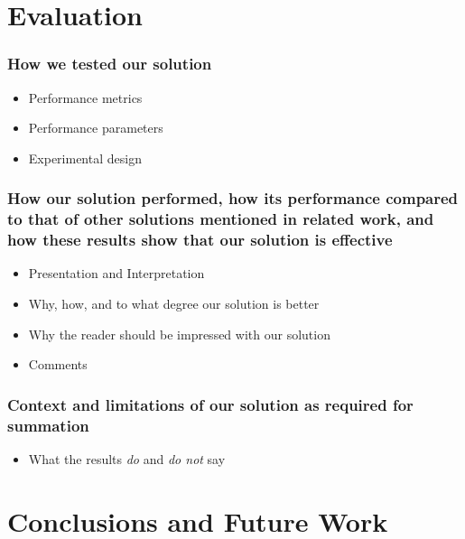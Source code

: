 \documentclass[11pt]{article}
\begin{document}
\section{Evaluation}
\label{sec:Evaluation}

\subsubsection*{How we tested our solution}
\begin{itemize}
\item   Performance metrics 
\item   Performance parameters
\item   Experimental design

\end{itemize}


\subsubsection*{How our solution performed, how its performance compared to
that of other solutions mentioned in related work, and how these results show
that our solution is effective}

\begin{itemize}
\item   Presentation and Interpretation
\item   Why, how, and to what degree our solution is better
\item   Why the reader should be impressed with our solution
\item   Comments

\end{itemize}


\subsubsection*{Context and limitations of our solution as required for 
summation}
\begin{itemize}
\item   What the results {\em do} and {\em do not} say

\end{itemize}



\section{Conclusions and Future Work}
\label{sec:Conclusion}
\end{document}
